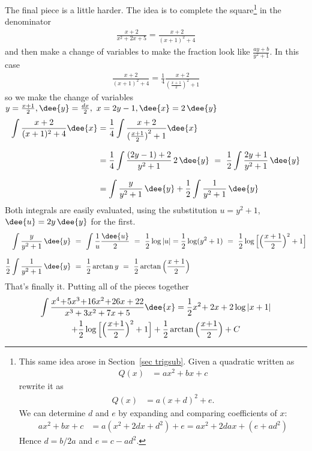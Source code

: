 \begin{eg}
\begin{itemize}
The final piece is a little harder. The idea is to complete the square\footnote{This same
idea arose in Section~\ref{sec trigsub}. Given a quadratic written as
\begin{align*}
  Q(x) &= ax^2+bx+c
\end{align*}
rewrite it as
\begin{align*}
  Q(x) &= a(x+d)^2+e.
\end{align*}
We can determine $d$ and $e$ by expanding and comparing coefficients of $x$:
\begin{align*}
  ax^2+bx+c &= a(x^2+2dx+d^2)+e = ax^2 + 2dax + (e+ad^2)
\end{align*}
Hence $d=b/2a$ and $e=c-ad^2$.} in the denominator
\begin{align*}
\frac{x+2}{x^2+2x+5}= \frac{x+2}{(x+1)^2+4}
\end{align*}
and then make a change of variables to make the fraction look like
$\frac{ay+b}{y^2+1}$. In this case
\begin{align*}
\frac{x+2}{(x+1)^2+4}=\frac{1}{4}\frac{x+2}{(\frac{x+1}{2})^2+1}
\end{align*}
so we make the change of variables $y=\frac{x+1}{2},\dee{y}=\frac{dx}{2},\
x=2y-1,\dee{x}=2\,\dee{y}$
\begin{align*}
\int \frac{x+2}{(x+1)^2+4}\dee{x}
&=\frac{1}{4}\int \frac{x+2}{{(\frac{x+1}{2})}^2+1}\dee{x} \\[0.1in]
&=\frac{1}{4}\int \frac{(2y-1)+2}{y^2+1}\,2\,\dee{y}
\ =\ \frac{1}{2}\int \frac{2y+1}{y^2+1}\,\dee{y}\\[0.1in]
&=\int \frac{y}{y^2+1}\,\dee{y} + \frac{1}{2}\int \frac{1}{y^2+1}\,\dee{y}
\end{align*}
Both integrals are easily evaluated, using the substitution $u=y^2+1$,
$\dee{u}=2y\,\dee{y}$ for the first.
\begin{align*}
\int \frac{y}{y^2+1}\,\dee{y}
&\ =\ \int \frac{1}{u}\frac{\dee{u}}{2}
\ =\ \frac{1}{2}\log|u|=\frac{1}{2}\log(y^2+1)
\ =\ \frac{1}{2}\log\Big[\Big(\frac{x+1}{2}\Big)^2+1\Big]\\[0.1in]
\frac{1}{2}\int \frac{1}{y^2+1}\,\dee{y}
&\ =\ \frac{1}{2}\arctan y
\ =\ \frac{1}{2}\arctan\Big(\frac{x+1}{2}\Big)
\end{align*}
That's finally it. Putting all of the pieces together
\begin{multline*}
\int\frac{x^4\!+\!5x^3\!+\!16x^2\!+\!26x+22}{x^3+3x^2+7x+5}\dee{x}
=\frac{1}{2} x^2\!+2x+2\log|x+1| \\
       +\frac{1}{2}\log\Big[\Big(\frac{x\!+\!1}{2}\Big)^2+1\Big]
+\frac{1}{2}\arctan\Big(\frac{x\!+\!1}{2}\Big)+C
\end{multline*}
\end{itemize}
\end{eg}


